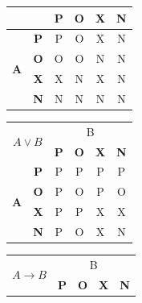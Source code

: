 \documentclass[a4paper,11pt]{article}
\begin{document}
\begin{center}
\begin{table}[ht]
\begin{varwidth}[t]{\linewidth}
\begin{tabular}{|c|c|c|c|c|c|}
                    \cline{3-6}
                    \multicolumn{2}{|c|}{} & \textbf{P} & \textbf{O} & \textbf{X} & \textbf{N} \\ 
                    \hline
                    \multirow{4}{*}{\textbf{A}} & \textbf{P} & P & O & X & N \\ 
                    \cline{2-6}
                    & \textbf{O} & O & O & N & N \\ 
                    \cline{2-6}
                    & \textbf{X} & X & N & X & N \\ 
                    \cline{2-6}
                    & \textbf{N} & N & N & N & N \\ 
                    \hline
                \end{tabular}
            \end{varwidth}
            \begin{varwidth}[t]{\linewidth}
                \centering
                \begin{tabular}{|c|c|c|c|c|c|}
                    \hline
                    \multicolumn{2}{|c|}{\multirow{2}{*}{$A \lor B$}} & \multicolumn{4}{c|}{B} \\ 
                    \cline{3-6}
                    \multicolumn{2}{|c|}{} & \textbf{P} & \textbf{O} & \textbf{X} & \textbf{N} \\ 
                    \hline
                    \multirow{4}{*}{\textbf{A}} & \textbf{P} & P & P & P & P \\ 
                    \cline{2-6}
                    & \textbf{O} & P & O & P & O \\ 
                    \cline{2-6}
                    & \textbf{X} & P & P & X & X \\ 
                    \cline{2-6}
                    & \textbf{N} & P & O & X & N \\ 
                    \hline
                \end{tabular}
            \end{varwidth}
            \begin{varwidth}[t]{\linewidth}
                \centering
                \begin{tabular}{|c|c|c|c|c|c|}
                    \hline
                    \multicolumn{2}{|c|}{\multirow{2}{*}{$A \to B$}} & \multicolumn{4}{c|}{B} \\ 
                    \cline{3-6}
                    \multicolumn{2}{|c|}{} & \textbf{P} & \textbf{O} & \textbf{X} & \textbf{N} \\ 

\end{tabular}
\end{varwidth}
\end{table}
\end{center}
\end{document}

